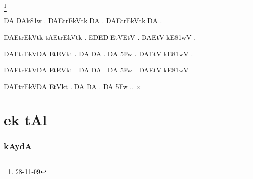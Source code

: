 \documentclass{tufte-book}
\def\samaindent{\parindent=0.5in}
\def\dnitem#1{\noindent\llap{#1\space}\leftskip\parindent}
\begin{document}
{\dn \dnnum
{\dnsamaveda %
\dnitem{\rn{1}}\footnote{28-11-09}

DA DAk\381w . DAEtrEkVtk DA . DAEtrEkVtk DA .

DAEtrEkVtk tAEtrEkVtk . ED\2ED\2 EtVEtV . DAEtV kE\381wV .

DAEtrEkVDA EtEVkt . DA DA . DA \35Fw . DAEtV kE\381wV .

DAEtrEkVDA EtEVkt . DA DA . DA \35Fw . DAEtV kE\381wV .

DAEtrEkVDA EtVkt . DA DA . DA \35Fw ..  {\NormalFont $\times$} 

}}

{\dn\chapter{ ek tAl}}

\subsection{{\dn kAydA \dnnum {}}}
\end{document}

